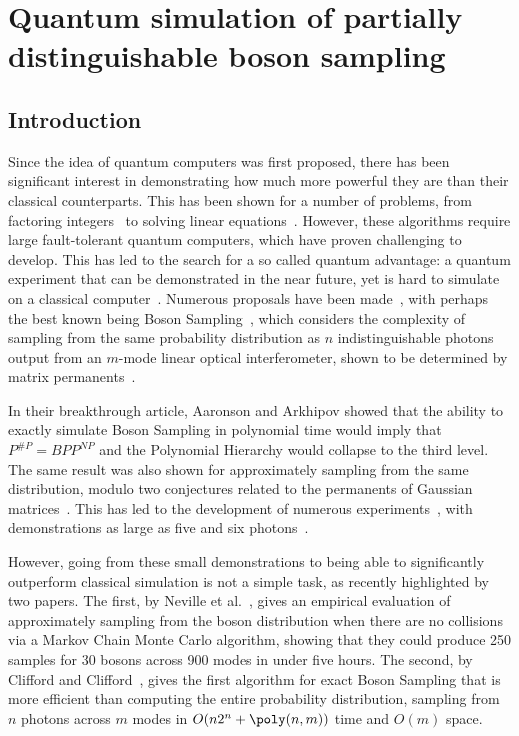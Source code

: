\chapter{Quantum simulation of partially distinguishable boson sampling}
\label{chp:noisy_circuit}

\section{Introduction}

Since the idea of quantum computers was first proposed, there has been significant interest in demonstrating how much more powerful they are than their classical counterparts. 
This has been shown for a number of problems, from factoring integers~\cite{shor1997} to solving linear equations~\cite{harrow2009}. 
However, these algorithms require large fault-tolerant quantum computers, which have proven challenging to develop. 
This has led to the search for a so called quantum advantage: a quantum experiment that can be demonstrated in the near future, yet is hard to simulate on a classical computer~\cite{harrow2017}. 
Numerous proposals have been made~\cite{bremner2016, boixo2016}, with perhaps the best known being Boson Sampling~\cite{aaronson2011}, which considers the complexity of sampling from the same probability distribution as $n$ indistinguishable photons output from an $m$-mode linear optical interferometer, shown to be determined by matrix permanents~\cite{scheel2008}.

In their breakthrough article, Aaronson and Arkhipov showed that the ability to exactly simulate Boson Sampling in polynomial time would imply that $P^{\#P} = BPP^{NP}$ and the Polynomial Hierarchy would collapse to the third level. 
The same result was also shown for approximately sampling from the same distribution, modulo two conjectures related to the permanents of Gaussian matrices~\cite{aaronson2011}. 
This has led to the development of numerous experiments~\cite{broome2013, spring2013, tillmann2013, crespi2013}, with demonstrations as large as five and six photons~\cite{carolan2015, wang2017}.

However, going from these small demonstrations to being able to significantly outperform classical simulation is not a simple task, as recently highlighted by two papers. 
The first, by Neville et al.~\cite{neville2017}, gives an empirical evaluation of approximately sampling from the boson distribution when there are no collisions via a Markov Chain Monte Carlo algorithm, showing that they could produce 250 samples for 30 bosons across 900 modes in under five hours. 
The second, by Clifford and Clifford~\cite{clifford2017}, gives the first algorithm for exact Boson Sampling that is more efficient than computing the entire probability distribution, sampling from $n$ photons across $m$ modes in $O(n2^n + \poly(n,m))$ time and $O(m)$ space.

